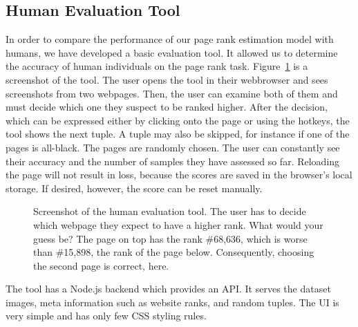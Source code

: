 \subsection{Human Evaluation Tool}
\label{sec:humanevaltool}

In order to compare the performance of our page rank estimation model with humans, we have developed a basic evaluation tool. It allowed us to determine the accuracy of human individuals on the page rank task. Figure~\ref{fig:humanevalscreenshot} is a screenshot of the tool. The user opens the tool in their webbrowser and sees screenshots from two webpages. Then, the user can examine both of them and must decide which one they suspect to be ranked higher. After the decision, which can be expressed either by clicking onto the page or using the hotkeys, the tool shows the next tuple. A tuple may also be skipped, for instance if one of the pages is all-black. The pages are randomly chosen. The user can constantly see their accuracy and the number of samples they have assessed so far. Reloading the page will not result in loss, because the scores are saved in the browser's local storage. If desired, however, the score can be reset manually.

\begin{figure}\centering
    \caption[Screenshot of the human evaluation tool]{Screenshot of the human evaluation tool. The user has to decide which webpage they expect to have a higher rank. What would your guess be? The page on top has the rank \#68,636, which is worse than \#15,898, the rank of the page below. Consequently, choosing the second page is correct, here.}\label{fig:humanevalscreenshot}
\end{figure}

The tool has a Node.js backend which provides an API. It serves the dataset images, meta information such as website ranks, and random tuples. The UI is very simple and has only few CSS styling rules.

